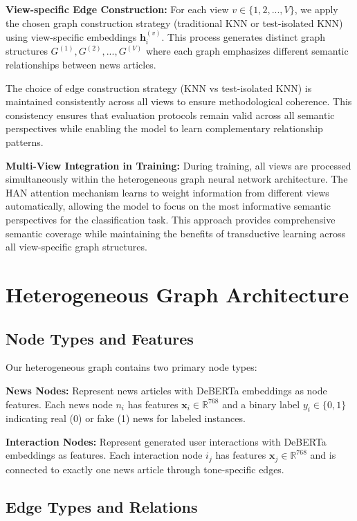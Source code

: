 \textbf{View-specific Edge Construction:} For each view $v \in \{1, 2, ..., V\}$, we apply the chosen graph construction strategy (traditional KNN or test-isolated KNN) using view-specific embeddings $\mathbf{h}_i^{(v)}$. This process generates distinct graph structures $G^{(1)}, G^{(2)}, ..., G^{(V)}$ where each graph emphasizes different semantic relationships between news articles.

The choice of edge construction strategy (KNN vs test-isolated KNN) is maintained consistently across all views to ensure methodological coherence. This consistency ensures that evaluation protocols remain valid across all semantic perspectives while enabling the model to learn complementary relationship patterns.

\textbf{Multi-View Integration in Training:} During training, all views are processed simultaneously within the heterogeneous graph neural network architecture. The HAN attention mechanism learns to weight information from different views automatically, allowing the model to focus on the most informative semantic perspectives for the classification task. This approach provides comprehensive semantic coverage while maintaining the benefits of transductive learning across all view-specific graph structures.

\section{Heterogeneous Graph Architecture}

\subsection{Node Types and Features}

Our heterogeneous graph contains two primary node types:

\textbf{News Nodes:} Represent news articles with DeBERTa embeddings as node features. Each news node $n_i$ has features $\mathbf{x}_i \in \mathbb{R}^{768}$ and a binary label $y_i \in \{0, 1\}$ indicating real (0) or fake (1) news for labeled instances.

\textbf{Interaction Nodes:} Represent generated user interactions with DeBERTa embeddings as features. Each interaction node $i_j$ has features $\mathbf{x}_j \in \mathbb{R}^{768}$ and is connected to exactly one news article through tone-specific edges.

\subsection{Edge Types and Relations}

